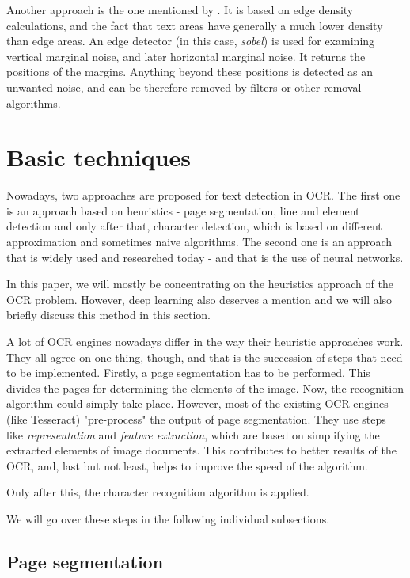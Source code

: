 Another approach is the one mentioned by \citet{marginalNoiseEdge}. It is based on edge density calculations, and the fact that text areas have generally a much lower density than edge areas. An edge detector (in this case, \emph{sobel}) is used for examining vertical marginal noise, and later horizontal marginal noise. It returns the positions of the margins. Anything beyond these positions is detected as an unwanted noise, and can be therefore removed by filters or other removal algorithms.

\section{Basic techniques }

Nowadays, two approaches are proposed for text detection in OCR. The first one is an approach based on heuristics - page segmentation, line and element detection and only after that, character detection, which is based on different approximation and sometimes naive algorithms. The second one is an approach that is widely used and researched today - and that is the use of neural networks.

In this paper, we will mostly be concentrating on the heuristics approach of the OCR problem. However, deep learning also deserves a mention and we will also briefly discuss this method in this section.

A lot of OCR engines nowadays differ in the way their heuristic approaches work. They all agree on one thing, though, and that is the succession of steps that need to be implemented. Firstly, a page segmentation has to be performed. This divides the pages for determining the elements of the image. Now, the recognition algorithm could simply take place. However, most of the existing OCR engines (like Tesseract) "pre-process" the output of page segmentation. They use steps like \emph{representation} and \emph{feature extraction}, which are based on simplifying the extracted elements of image documents. This contributes to better results of the OCR, and, last but not least, helps to improve the speed of the algorithm.

Only after this, the character recognition algorithm is applied.

We will go over these steps in the following individual subsections.

\subsection{Page segmentation}

